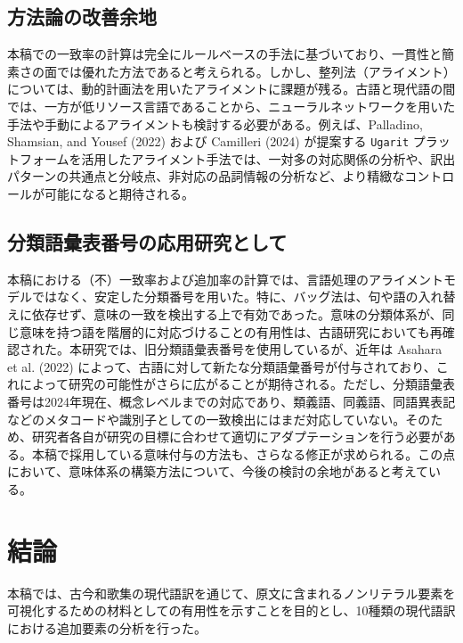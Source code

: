 \documentclass[
  letterpaper,
  DIV=11,
  numbers=noendperiod]{scrartcl}
\begin{document}
\subsection{方法論の改善余地}\label{ux65b9ux6cd5ux8ad6ux306eux6539ux5584ux4f59ux5730}

本稿での一致率の計算は完全にルールベースの手法に基づいており、一貫性と簡素さの面では優れた方法であると考えられる。しかし、整列法（アライメント）については、動的計画法を用いたアライメントに課題が残る。古語と現代語の間では、一方が低リソース言語であることから、ニューラルネットワークを用いた手法や手動によるアライメントも検討する必要がある。例えば、Palladino,
Shamsian, and Yousef (2022) および Camilleri (2024) が提案する
\texttt{Ugarit}
プラットフォームを活用したアライメント手法では、一対多の対応関係の分析や、訳出パターンの共通点と分岐点、非対応の品詞情報の分析など、より精緻なコントロールが可能になると期待される。

\subsection{分類語彙表番号の応用研究として}\label{ux5206ux985eux8a9eux5f59ux8868ux756aux53f7ux306eux5fdcux7528ux7814ux7a76ux3068ux3057ux3066}

本稿における（不）一致率および追加率の計算では、言語処理のアライメントモデルではなく、安定した分類番号を用いた。特に、バッグ法は、句や語の入れ替えに依存せず、意味の一致を検出する上で有効であった。意味の分類体系が、同じ意味を持つ語を階層的に対応づけることの有用性は、古語研究においても再確認された。本研究では、旧分類語彙表番号を使用しているが、近年は
Asahara et al. (2022)
によって、古語に対して新たな分類語彙番号が付与されており、これによって研究の可能性がさらに広がることが期待される。ただし、分類語彙表番号は2024年現在、概念レベルまでの対応であり、類義語、同義語、同語異表記などのメタコードや識別子としての一致検出にはまだ対応していない。そのため、研究者各自が研究の目標に合わせて適切にアダプテーションを行う必要がある。本稿で採用している意味付与の方法も、さらなる修正が求められる。この点において、意味体系の構築方法について、今後の検討の余地があると考えている。

\section{結論}\label{sec-conclusions}

本稿では、古今和歌集の現代語訳を通じて、原文に含まれるノンリテラル要素を可視化するための材料としての有用性を示すことを目的とし、10種類の現代語訳における追加要素の分析を行った。
\end{document}
